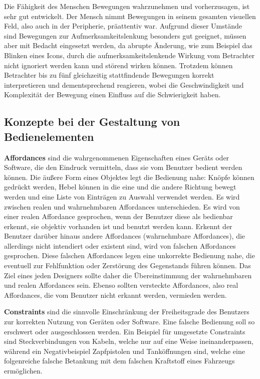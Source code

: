 Die Fähigkeit des Menschen Bewegungen wahrzunehmen und vorherzusagen, ist sehr gut entwickelt. Der Mensch nimmt Bewegungen in seinem gesamten visuellen Feld, also auch in der Peripherie, präattentiv war. Aufgrund dieser Umstände sind Bewegungen zur Aufmerksamkeitslenkung besonders gut geeignet, müssen aber mit Bedacht eingesetzt werden, da abrupte Änderung, wie zum Beispiel das Blinken eines Icons, durch die aufmerksamkeitslenkende Wirkung vom Betrachter nicht ignoriert werden kann und störend wirken können. Trotzdem können Betrachter bis zu fünf gleichzeitig stattfindende Bewegungen korrekt interpretieren und dementsprechend reagieren, wobei die Geschwindigkeit und Komplexität der Bewegung einen Einfluss auf die Schwierigkeit haben. \cite[S. 60 f.]{2010.Preim}

\subsection{Konzepte bei der Gestaltung von Bedienelementen}
\textbf{Affordances} sind die wahrgenommenen Eigenschaften eines Geräts oder Software, die den Eindruck vermitteln, dass sie vom Benutzer bedient werden können. Die äußere Form eines Objektes legt die Bedienung nahe: Knöpfe können gedrückt werden, Hebel können in die eine und die andere Richtung bewegt werden und eine Liste von Einträgen zu Auswahl verwendet werden. Es wird zwischen realen und wahrnehmbaren Affordances unterschieden. Es wird von einer realen Affordance gesprochen, wenn der Benutzer diese als bedienbar erkennt, sie objektiv vorhanden ist und benutzt werden kann. Erkennt der Benutzer darüber hinaus andere Affordances (wahrnehmbare Affordances), die allerdings nicht intendiert oder existent sind, wird von falschen Affordances gesprochen. Diese falschen Affordances legen eine unkorrekte Bedienung nahe, die eventuell zur Fehlfunktion oder Zerstörung des Gegenstands führen können. Das Ziel eines jeden Designers sollte daher die Übereinstimmung der wahrnehmbaren und realen Affordances sein. Ebenso sollten versteckte Affordances, also real Affordances, die vom Benutzer nicht erkannt werden, vermieden werden. \cite[S. 136 ff.]{2010.Preim}

\textbf{Constraints} sind die sinnvolle Einschränkung der Freiheitsgrade des Benutzers zur korrekten Nutzung von Geräten oder Software. Eine falsche Bedienung soll so erschwert oder ausgeschlossen werden. Ein Beispiel für umgesetzte Constraints sind Steckverbindungen von Kabeln, welche nur auf eine Weise ineinanderpassen, während ein Negativbeispiel Zapfpistolen und Tanköffnungen sind, welche eine folgenreiche falsche Betankung mit dem falschen Kraftstoff eines Fahrzeugs ermöglichen. \cite[S. 136 ff.]{2010.Preim}

